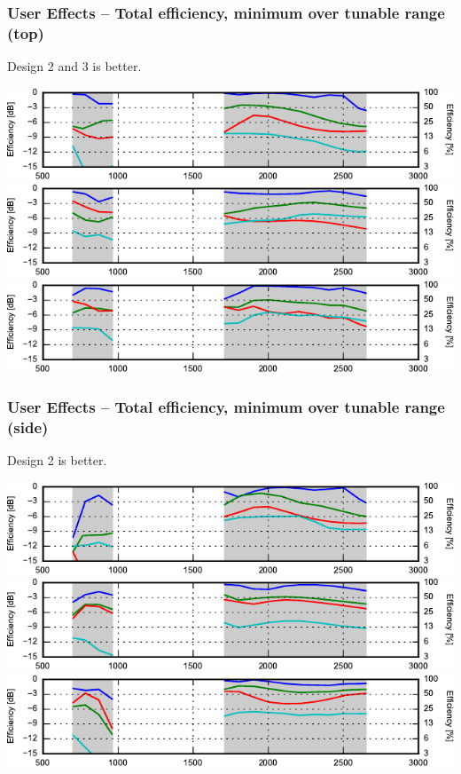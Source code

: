 \begin{frame}
    \frametitle{User Effects -- Total efficiency, minimum over tunable range (top)}
    Design 2 and 3 is better.
    \begin{center}
        \includegraphics{img/soren/ue/design1lt/efftop.pdf}\\
        \includegraphics{img/soren/ue/design2sn/efftop.pdf}\\
        \includegraphics{img/soren/ue/design3hv/efftop.pdf}
    \end{center}
    \legendfooter
\end{frame}

\begin{frame}
    \frametitle{User Effects -- Total efficiency, minimum over tunable range (side)}
    Design 2 is better.
    \begin{center}
        \includegraphics{img/soren/ue/design1lt/effside.pdf}\\
        \includegraphics{img/soren/ue/design2sn/effside.pdf}\\
        \includegraphics{img/soren/ue/design3hv/effside.pdf}
    \end{center}
    \legendfooter
\end{frame}

